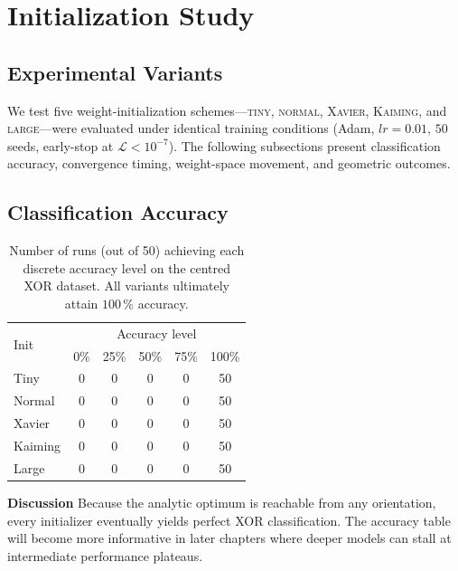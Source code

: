 ﻿%

\section{Initialization Study}
\label{sec:abs1-init}

\subsection*{Experimental Variants}
We test five weight-initialization schemes—\textsc{tiny}, \textsc{normal},
\textsc{Xavier}, \textsc{Kaiming}, and \textsc{large}—were evaluated under
identical training conditions (Adam, $lr=0.01$, $50$ seeds, early-stop at
$\mathcal L<10^{-7}$).  The following subsections present classification
accuracy, convergence timing, weight-space movement, and geometric outcomes.

\subsection*{Classification Accuracy}

\begin{table}[h]
\centering
\caption{Number of runs (out of 50) achieving each discrete accuracy level
on the centred XOR dataset.  All variants ultimately attain $100\,\%$
accuracy.}
\label{tab:abs1-init-accuracy}
\begin{tabular}{lccccc}
\toprule
\multirow{2}{*}{Init} & \multicolumn{5}{c}{Accuracy level}\\
\cmidrule(lr){2-6}
 & 0\% & 25\% & 50\% & 75\% & 100\% \\
\midrule
Tiny    & 0 & 0 & 0 & 0 & 50 \\
Normal  & 0 & 0 & 0 & 0 & 50 \\
Xavier  & 0 & 0 & 0 & 0 & 50 \\
Kaiming & 0 & 0 & 0 & 0 & 50 \\
Large   & 0 & 0 & 0 & 0 & 50 \\
\bottomrule
\end{tabular}
\end{table}

\textbf{Discussion}  
Because the analytic optimum is reachable from any orientation, every
initializer eventually yields perfect XOR classification.  The accuracy table
will become more informative in later chapters where deeper models can stall
at intermediate performance plateaus.

